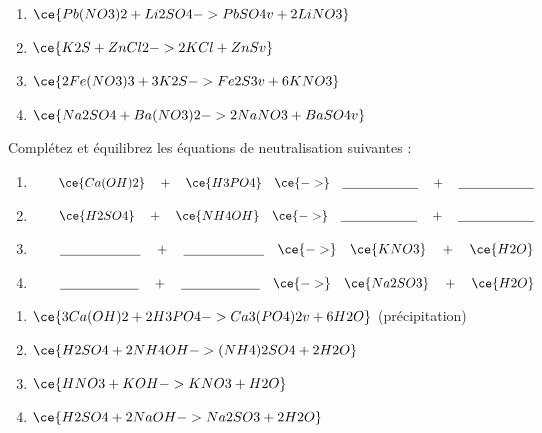 \documentclass[
  11pt,
  a4paper,
  openany]{book}
\begin{document}
\begin{Answer}

\begin{enumerate}
\def\labelenumi{\arabic{enumi}.}
\item
  \(\ce{Pb(NO3)2 + Li2SO4 -> PbSO4 v + 2LiNO3}\)
\item
  \(\ce{K2S + ZnCl2 -> 2KCl + ZnS v}\)
\item
  \(\ce{2Fe(NO3)3 + 3K2S -> Fe2S3 v + 6KNO3}\)
\item
  \(\ce{Na2SO4 + Ba(NO3)2 -> 2NaNO3 + BaSO4 v}\)
\end{enumerate}

\end{Answer}

\begin{Exercise}

Complétez et équilibrez les équations de neutralisation suivantes :

\begin{enumerate}
\def\labelenumi{\arabic{enumi}.}
\item
  \(\qquad \ce{Ca(OH)2} \quad + \quad \ce{H3PO4} \quad \ce{->}  \quad \underline{\hspace{6em}} \quad + \quad \underline{\hspace{6em}}\)
\item
  \(\qquad \ce{H2SO4} \quad + \quad \ce{NH4OH} \quad \ce{->}  \quad \underline{\hspace{6em}} \quad + \quad \underline{\hspace{6em}}\)
\item
  \(\qquad \underline{\hspace{6em}} \quad + \quad \underline{\hspace{6em}} \quad \ce{->}  \quad \ce{KNO3} \quad + \quad \ce{H2O}\)
\item
  \(\qquad \underline{\hspace{6em}} \quad + \quad \underline{\hspace{6em}} \quad \ce{->}  \quad \ce{Na2SO3} \quad + \quad \ce{H2O}\)
\end{enumerate}

\end{Exercise}

\begin{Answer}

\begin{enumerate}
\def\labelenumi{\arabic{enumi}.}
\item
  \(\ce{3 Ca(OH)2 + 2 H3PO4 -> Ca3(PO4)2 v + 6 H2O}\) (précipitation)
\item
  \(\ce{H2SO4 + 2NH4OH -> (NH4)2SO4 + 2 H2O}\)
\item
  \(\ce{HNO3 + KOH -> KNO3 + H2O}\)
\item
  \(\ce{H2SO4 + 2 NaOH -> Na2SO3 + 2 H2O}\)
\end{enumerate}

\end{Answer}
\end{document}
